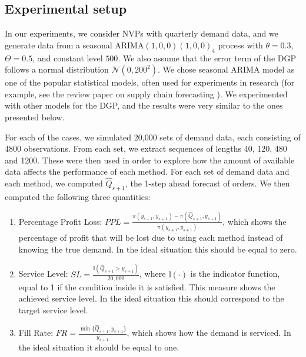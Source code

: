 \documentclass{article}
\begin{document}
\subsection{Experimental setup}

In our experiments, we consider NVPs with quarterly demand data, and we generate data from a seasonal ARIMA$(1,0,0)(1,0,0)_4$ process with $\theta=0.3$, $\Theta=0.5$, and constant level $500$. We also assume that the error term of the DGP follows a normal distribution $\mathcal{N}(0,200^2)$. We chose seasonal ARIMA model as one of the popular statistical models, often used for experiments in research (for example, see the review paper on supply chain forecasting \cite{SBBKN16}). We experimented with other models for the DGP, and the results were very similar to the ones presented below.

For each of the cases, we simulated 20,000 sets of demand data, each consisting of 4800 observations. From each set, we extract sequences of lengths 40, 120, 480 and 1200. These were then used in order to explore how the amount of available data affects the performance of each method. For each set of demand data and each method, we computed $\hat{Q}_{s+1}$, the 1-step ahead forecast of orders. We then computed the following three quantities:
\begin{enumerate}
    \item Percentage Profit Loss:  $PPL=\frac{\pi(y_{s+1},y_{s+1})-\pi(\hat{Q}_{s+1},y_{s+1})}{\pi(y_{s+1},y_{s+1})}$, which shows the percentage of profit that will be lost due to using each method instead of knowing the true demand. In the ideal situation this should be equal to zero.
    \item Service Level: $SL=\frac{\mathbb {I}{(\hat{Q}_{s+1}>y_{s+1})}}{20,000}$, where $\mathbb {I}(\cdot)$ is the indicator function, equal to 1 if the condition inside it is satisfied. This measure shows the achieved service level. In the ideal situation this should correspond to the target service level.
    \item Fill Rate: $FR=\frac{\min\{\hat{Q}_{s+1},y_{s+1}\}}{y_{s+1}}$, which shows how the demand is serviced. In the ideal situation it should be equal to one.
\end{enumerate}
\end{document}
